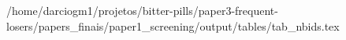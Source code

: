 /home/darciogm1/projetos/bitter-pills/paper3-frequent-losers/papers_finais/paper1_screening/output/tables/tab_nbids.tex